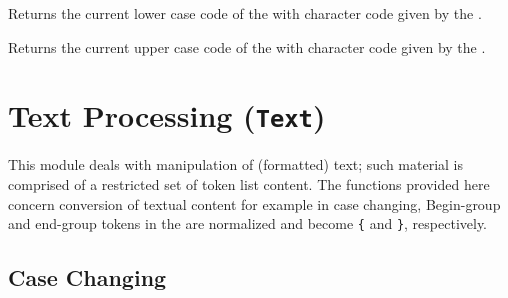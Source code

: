 \documentclass[oneside]{book}
\begin{document}
\begin{function}{\CharValueLccode}
\begin{syntax}
 
\end{syntax}
Returns the current lower case code of the  with
character code given by the
.
\end{function}

\begin{function}{\CharValueUccode}
\begin{syntax}
 
\end{syntax}
Returns the current upper case code of the  with
character code given by the
.
\end{function}

%

\chapter{Text Processing (\texttt{Text})}

This module deals with manipulation of (formatted) text; such material is
comprised of a restricted set of token list content. The functions provided
here concern conversion of textual content for example in case changing,
Begin-group and end-group tokens in the 
are normalized and become \verb|{| and \verb|}|, respectively.

\section{Case Changing}
\end{document}
